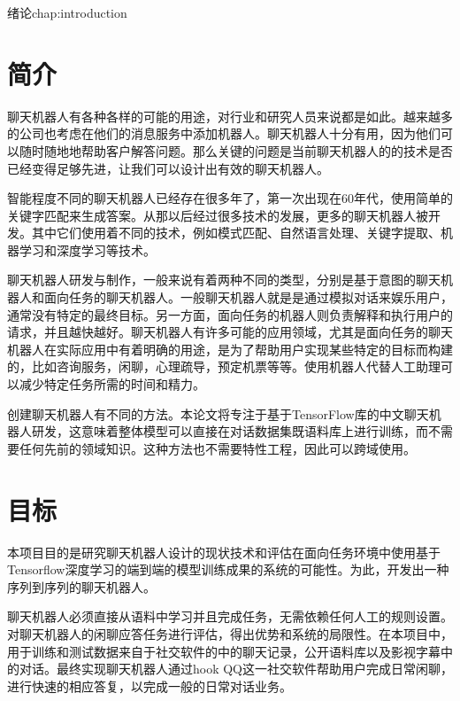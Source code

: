\begin{cuzchapter}{绪论}{chap:introduction}

\section{简介}\label{sec:background}

聊天机器人有各种各样的可能的用途，对行业和研究人员来说都是如此。越来越多的公司也考虑在他们的消息服务中添加机器人。聊天机器人十分有用，因为他们可以随时随地地帮助客户解答问题。那么关键的问题是当前聊天机器人的的技术是否已经变得足够先进，让我们可以设计出有效的聊天机器人。

智能程度不同的聊天机器人已经存在很多年了，第一次出现在60年代，\cite{Weizenbaum:1966:ECP:365153.365168}使用简单的关键字匹配来生成答案。从那以后经过很多技术的发展，更多的聊天机器人被开发。其中它们使用着不同的技术，例如模式匹配、自然语言处理、关键字提取、机器学习和深度学习等技术。

聊天机器人研发与制作，一般来说有着两种不同的类型，分别是基于意图的聊天机器人和面向任务的聊天机器人。一般聊天机器人就是是通过模拟对话来娱乐用户，通常没有特定的最终目标。另一方面，面向任务的机器人则负责解释和执行用户的请求，并且越快越好。聊天机器人有许多可能的应用领域，尤其是面向任务的聊天机器人在实际应用中有着明确的用途，是为了帮助用户实现某些特定的目标而构建的，比如咨询服务，闲聊，心理疏导，预定机票等等。使用机器人代替人工助理可以减少特定任务所需的时间和精力。

创建聊天机器人有不同的方法。本论文将专注于基于TensorFlow库的中文聊天机器人研发，这意味着整体模型可以直接在对话数据集既语料库上进行训练，而不需要任何先前的领域知识。这种方法也不需要特性工程，因此可以跨域使用。
\section{目标}\label{sec:background}

本项目目的是研究聊天机器人设计的现状技术和评估在面向任务环境中使用基于Tensorflow深度学习的端到端的模型训练成果的系统的可能性。为此，开发出一种序列到序列的聊天机器人。

聊天机器人必须直接从语料中学习并且完成任务，无需依赖任何人工的规则设置。对聊天机器人的闲聊应答任务进行评估，得出优势和系统的局限性。在本项目中，用于训练和测试数据来自于社交软件的中的聊天记录，公开语料库以及影视字幕中的对话。最终实现聊天机器人通过hook QQ这一社交软件帮助用户完成日常闲聊，进行快速的相应答复，以完成一般的日常对话业务。

\end{cuzchapter}